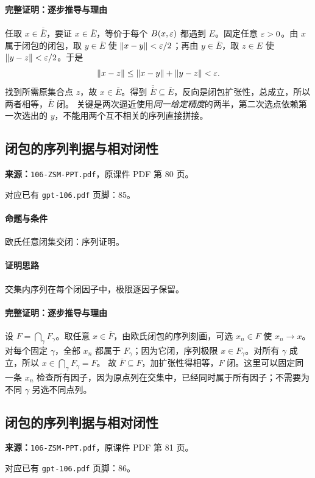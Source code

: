 \paragraph{完整证明：逐步推导与理由}

任取 $x\in\overline{\overline E}$，要证 $x\in\overline E$，等价于每个 $B(x,\varepsilon)$ 都遇到 $E$。固定任意 $\varepsilon>0$。由 $x$ 属于闭包的闭包，取 $y\in\overline E$ 使 $\|x-y\|<\varepsilon/2$；再由 $y\in\overline E$，取 $z\in E$ 使 $\|y-z\|<\varepsilon/2$。于是
\[\|x-z\|\le\|x-y\|+\|y-z\|<\varepsilon.\]
找到所需原集合点 $z$，故 $x\in\overline E$。得到 $\overline{\overline E}\subseteq\overline E$，反向是闭包扩张性，总成立，所以两者相等，$\overline E$ 闭。
关键是两次逼近使用\emph{同一给定精度}的两半，第二次选点依赖第一次选出的 $y$，不能用两个互不相关的序列直接拼接。

\clearpage\subsection{闭包的序列判据与相对闭性}
\textbf{来源：}\texttt{106-ZSM-PPT.pdf}，原课件 PDF 第 80 页。\par
对应已有 \texttt{gpt-106.pdf} 页脚：85。\par
\paragraph{命题与条件}欧氏任意闭集交闭：序列证明。
\paragraph{证明思路}交集内序列在每个闭因子中，极限逐因子保留。
\paragraph{完整证明：逐步推导与理由}

设 $F=\bigcap_\gamma F_\gamma$。取任意 $x\in\overline F$，由欧氏闭包的序列刻画，可选 $x_n\in F$ 使 $x_n\to x$。对每个固定 $\gamma$，全部 $x_n$ 都属于 $F_\gamma$；因为它闭，序列极限 $x\in F_\gamma$。对所有 $\gamma$ 成立，所以 $x\in\bigcap_\gamma F_\gamma=F$。
故 $\overline F\subseteq F$，加扩张性得相等，$F$ 闭。这里可以固定同一条 $x_n$ 检查所有因子，因为原点列在交集中，已经同时属于所有因子；不需要为不同 $\gamma$ 另选不同点列。

\clearpage\subsection{闭包的序列判据与相对闭性}
\textbf{来源：}\texttt{106-ZSM-PPT.pdf}，原课件 PDF 第 81 页。\par
对应已有 \texttt{gpt-106.pdf} 页脚：86。\par
